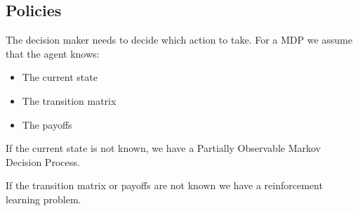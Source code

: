 \subsection{Policies}

The decision maker needs to decide which action to take. For a MDP we assume that the agent knows:

\begin{itemize}
\item The current state
\item The transition matrix
\item The payoffs
\end{itemize}

If the current state is not known, we have a Partially Observable Markov Decision Process.

If the transition matrix or payoffs are not known we have a reinforcement learning problem.

